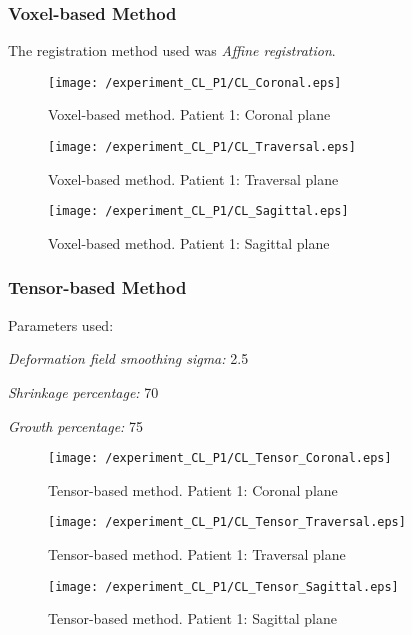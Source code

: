 \subsubsection{Voxel-based Method}
The registration method used was \textit{Affine registration}.

\begin{figure}[H]
  \centering
  \texttt{[image: /experiment\_CL\_P1/CL\_Coronal.eps]}
  \caption{Voxel-based method. Patient 1: Coronal plane}
  \label{CL_Coronal}
\end{figure}

\begin{figure}[H]
  \centering
  \texttt{[image: /experiment\_CL\_P1/CL\_Traversal.eps]}
  \caption{Voxel-based method. Patient 1: Traversal plane}
  \label{CL_Traversal}
\end{figure}

\begin{figure}[H]
  \centering
  \texttt{[image: /experiment\_CL\_P1/CL\_Sagittal.eps]}
  \caption{Voxel-based method. Patient 1: Sagittal plane}
  \label{CL_Sagittal}
\end{figure}


\subsubsection{Tensor-based Method}
Parameters used:
\begin{description}
\item \textit{Deformation field smoothing sigma:} 2.5
\item \textit{Shrinkage percentage:} 70
\item \textit{Growth percentage:} 75
\end{description}

\begin{figure}[H]
  \centering
  \texttt{[image: /experiment\_CL\_P1/CL\_Tensor\_Coronal.eps]}
  \caption{Tensor-based method. Patient 1: Coronal plane}
  \label{CL_TCoronal}
\end{figure}

\begin{figure}[H]
  \centering
  \texttt{[image: /experiment\_CL\_P1/CL\_Tensor\_Traversal.eps]}
  \caption{Tensor-based method. Patient 1: Traversal plane}
  \label{CL_TTraversal}
\end{figure}

\begin{figure}[H]
  \centering
  \texttt{[image: /experiment\_CL\_P1/CL\_Tensor\_Sagittal.eps]}
  \caption{Tensor-based method. Patient 1: Sagittal plane}
  \label{CL_TSagittal}
\end{figure}


